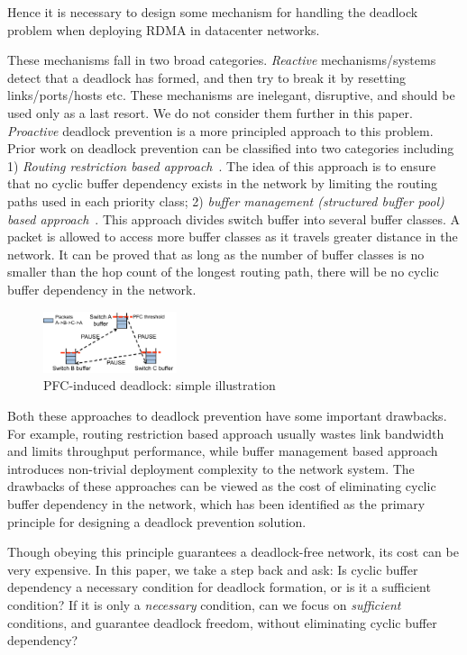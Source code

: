 Hence it is necessary to design some mechanism for handling the deadlock
problem when deploying RDMA in datacenter networks. 

These mechanisms fall in two broad categories. {\em Reactive} mechanisms/systems
detect that a deadlock has formed, and then try to break it by resetting
links/ports/hosts etc.  These mechanisms are inelegant, disruptive, and should
be used only as a last resort.  We do not consider them further in this paper.
{\em Proactive} deadlock prevention is a more principled approach to this
problem.  Prior work on deadlock prevention can be classified into two
categories including 1) \textit{Routing restriction based
approach}~\cite{tcpbolt,flich2012survey}. The idea of this approach is to ensure
that no cyclic buffer dependency exists in the network by limiting the routing
paths used in each priority class;  2) \textit{buffer management (structured
buffer pool) based approach}~\cite{gerla1980flow,karol2003prevention}. This
approach divides switch buffer into several buffer classes. A packet is allowed
to access more buffer classes as it travels greater distance in the network. It
can be proved that as long as the number of buffer classes is no smaller than
the hop count of the longest routing path, there will be no cyclic buffer
dependency in the network.

\begin{figure}
\centering
\includegraphics[width=0.35\textwidth] {figs/deadlock}
\vspace{-0.15in}
\caption{PFC-induced deadlock: simple illustration}
\vspace{-0.25in}
\label{fig:deadlock_example}
\end{figure}

Both these approaches to deadlock prevention have some important drawbacks. For
example, routing restriction based approach usually wastes link bandwidth and
limits throughput performance, while buffer management based approach introduces
non-trivial deployment complexity to the network system. The drawbacks of these
approaches can be viewed as the cost of eliminating cyclic buffer dependency in
the network, which has been identified as the primary principle for designing a
deadlock prevention solution.

Though obeying this principle guarantees a deadlock-free network, its cost can
be very expensive. In this paper, we take a step back and ask: Is cyclic buffer
dependency a necessary condition for deadlock formation, or is it a sufficient
condition? If it is only a {\em necessary} condition, can we focus on {\em
sufficient} conditions, and guarantee deadlock freedom, without  eliminating
cyclic buffer dependency?

